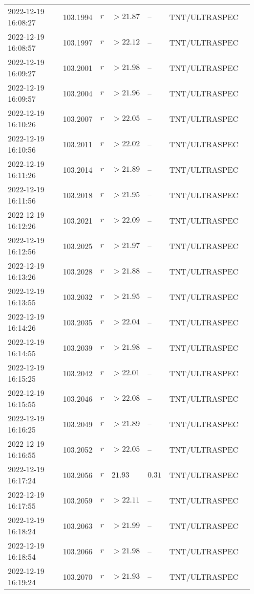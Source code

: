 \documentclass{nature_plusfigure}
\begin{document}
\begin{supplement}
\begin{center}
\begin{longtable}{lllllll}
2022-12-19 16:08:27 & 103.1994 & $r$ & $>21.87$ & -- & TNT/ULTRASPEC &  \\ 
2022-12-19 16:08:57 & 103.1997 & $r$ & $>22.12$ & -- & TNT/ULTRASPEC &  \\ 
2022-12-19 16:09:27 & 103.2001 & $r$ & $>21.98$ & -- & TNT/ULTRASPEC &  \\ 
2022-12-19 16:09:57 & 103.2004 & $r$ & $>21.96$ & -- & TNT/ULTRASPEC &  \\ 
2022-12-19 16:10:26 & 103.2007 & $r$ & $>22.05$ & -- & TNT/ULTRASPEC &  \\ 
2022-12-19 16:10:56 & 103.2011 & $r$ & $>22.02$ & -- & TNT/ULTRASPEC &  \\ 
2022-12-19 16:11:26 & 103.2014 & $r$ & $>21.89$ & -- & TNT/ULTRASPEC &  \\ 
2022-12-19 16:11:56 & 103.2018 & $r$ & $>21.95$ & -- & TNT/ULTRASPEC &  \\ 
2022-12-19 16:12:26 & 103.2021 & $r$ & $>22.09$ & -- & TNT/ULTRASPEC &  \\ 
2022-12-19 16:12:56 & 103.2025 & $r$ & $>21.97$ & -- & TNT/ULTRASPEC &  \\ 
2022-12-19 16:13:26 & 103.2028 & $r$ & $>21.88$ & -- & TNT/ULTRASPEC &  \\ 
2022-12-19 16:13:55 & 103.2032 & $r$ & $>21.95$ & -- & TNT/ULTRASPEC &  \\ 
2022-12-19 16:14:26 & 103.2035 & $r$ & $>22.04$ & -- & TNT/ULTRASPEC &  \\ 
2022-12-19 16:14:55 & 103.2039 & $r$ & $>21.98$ & -- & TNT/ULTRASPEC &  \\ 
2022-12-19 16:15:25 & 103.2042 & $r$ & $>22.01$ & -- & TNT/ULTRASPEC &  \\ 
2022-12-19 16:15:55 & 103.2046 & $r$ & $>22.08$ & -- & TNT/ULTRASPEC &  \\ 
2022-12-19 16:16:25 & 103.2049 & $r$ & $>21.89$ & -- & TNT/ULTRASPEC &  \\ 
2022-12-19 16:16:55 & 103.2052 & $r$ & $>22.05$ & -- & TNT/ULTRASPEC &  \\ 
2022-12-19 16:17:24 & 103.2056 & $r$ & $21.93$ & $0.31$ & TNT/ULTRASPEC &  \\ 
2022-12-19 16:17:55 & 103.2059 & $r$ & $>22.11$ & -- & TNT/ULTRASPEC &  \\ 
2022-12-19 16:18:24 & 103.2063 & $r$ & $>21.99$ & -- & TNT/ULTRASPEC &  \\ 
2022-12-19 16:18:54 & 103.2066 & $r$ & $>21.98$ & -- & TNT/ULTRASPEC &  \\ 
2022-12-19 16:19:24 & 103.2070 & $r$ & $>21.93$ & -- & TNT/ULTRASPEC &  \\ 

\end{longtable}
\end{center}
\end{supplement}
\end{document}
